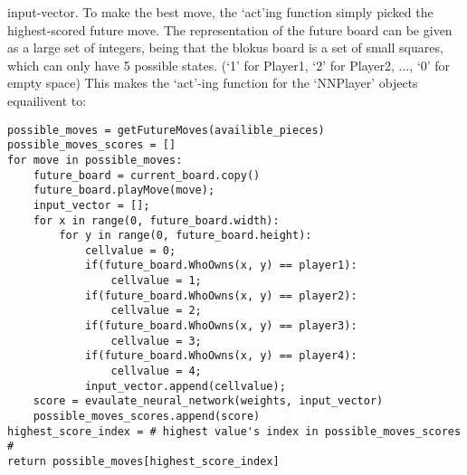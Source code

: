 \documentclass{report}
\begin{document}
		input-vector. To make the best move, the `act'ing function simply picked the highest-scored future move. The representation of the future board can be given as a large set of
		integers, being that the blokus board is a set of small squares, which can only have 5 possible states. (`1' for Player1, `2' for Player2, ..., `0' for empty space) This makes the `act'-ing
		function for the `NNPlayer' objects equailivent to:
		\lstset{language=Python}
		\lstset{basicstyle=\footnotesize}
		\begin{lstlisting}
possible_moves = getFutureMoves(availible_pieces)
possible_moves_scores = []
for move in possible_moves:
	future_board = current_board.copy()
	future_board.playMove(move);
	input_vector = [];
	for x in range(0, future_board.width):
		for y in range(0, future_board.height):
			cellvalue = 0;
			if(future_board.WhoOwns(x, y) == player1):
				cellvalue = 1;
			if(future_board.WhoOwns(x, y) == player2):
				cellvalue = 2;
			if(future_board.WhoOwns(x, y) == player3):
				cellvalue = 3;
			if(future_board.WhoOwns(x, y) == player4):
				cellvalue = 4;
			input_vector.append(cellvalue);
	score = evaulate_neural_network(weights, input_vector)
	possible_moves_scores.append(score)
highest_score_index = # highest value's index in possible_moves_scores #
return possible_moves[highest_score_index]
		\end{lstlisting}
\end{document}
